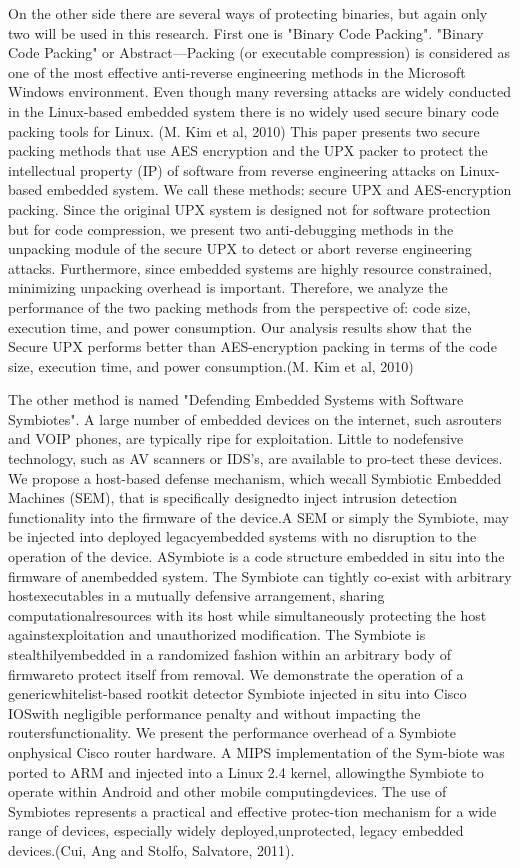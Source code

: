 \documentclass[]{report}
\begin{document}
\begin{center}
On the other side there are several ways of protecting binaries, but again only two will be used in this research. First one is "Binary Code Packing".
"Binary Code Packing" or Abstract—Packing (or executable compression) is considered as
one of the most effective anti-reverse engineering methods in
the Microsoft Windows environment. Even though many
reversing attacks are widely conducted in the Linux-based
embedded system there is no widely used secure binary code
packing tools for Linux. (M. Kim et al, 2010)
This paper presents two secure
packing methods that use AES encryption and the UPX packer
to protect the intellectual property (IP) of software from
reverse engineering attacks on Linux-based embedded system.
We call these methods: secure UPX and AES-encryption
packing. Since the original UPX system is designed not for
software protection but for code compression, we present two
anti-debugging methods in the unpacking module of the secure
UPX to detect or abort reverse engineering attacks.
Furthermore, since embedded systems are highly resource
constrained, minimizing unpacking overhead is important.
Therefore, we analyze the performance of the two packing
methods from the perspective of: code size, execution
time, and power consumption. Our analysis results show
that the Secure UPX performs better than AES-encryption
packing in terms of the code size, execution time, and power
consumption.(M. Kim et al, 2010)
						
The other method is named "Defending Embedded Systems with Software Symbiotes".
A large number of embedded devices on the internet, such asrouters and VOIP phones, are typically ripe for exploitation. Little to nodefensive technology, such as AV scanners or IDS’s, are available to pro-tect these devices. We propose a host-based defense mechanism, which wecall Symbiotic Embedded Machines (SEM), that is speciﬁcally designedto inject intrusion detection functionality into the ﬁrmware of the device.A SEM or simply the Symbiote, may be injected into deployed legacyembedded systems with no disruption to the operation of the device. ASymbiote is a code structure embedded in situ into the ﬁrmware of anembedded system. The Symbiote can tightly co-exist with arbitrary hostexecutables in a mutually defensive arrangement, sharing computationalresources with its host while simultaneously protecting the host againstexploitation and unauthorized modiﬁcation. The Symbiote is stealthilyembedded in a randomized fashion within an arbitrary body of ﬁrmwareto protect itself from removal. We demonstrate the operation of a genericwhitelist-based rootkit detector Symbiote injected in situ into Cisco IOSwith negligible performance penalty and without impacting the routersfunctionality. We present the performance overhead of a Symbiote onphysical Cisco router hardware. A MIPS implementation of the Sym-biote was ported to ARM and injected into a Linux 2.4 kernel, allowingthe Symbiote to operate within Android and other mobile computingdevices. The use of Symbiotes represents a practical and eﬀective protec-tion mechanism for a wide range of devices, especially widely deployed,unprotected, legacy embedded devices.(Cui, Ang and Stolfo, Salvatore, 2011).
\newline
\end{center}
\end{document}
